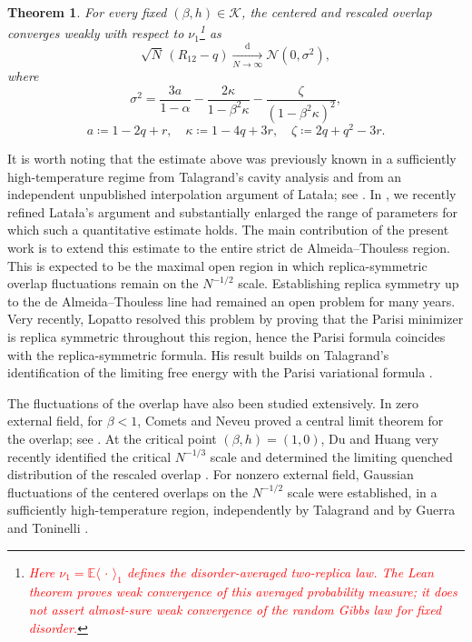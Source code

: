 \documentclass[11pt]{article}
\newtheorem{theorem}{Theorem}[section]
\numberwithin{equation}{section}
\newcommand{\1}{\mathbf 1}
\newcommand{\cK}{\mathcal K}
\begin{document}
\begin{theorem}
\label{thm:overlap-clt-intro}
For every fixed $(\beta,h)\in\cK$, the centered and rescaled overlap
converges weakly with respect to $\nu_1$\footnote{\textcolor{red}{Here $\nu_1=\mathbb E\langle\,\cdot\,\rangle_1$ defines the disorder-averaged two-replica law.  The Lean theorem proves weak convergence of this averaged probability measure; it does not assert almost-sure weak convergence of the random Gibbs law for fixed disorder.}} as
\[
 \sqrt N\,(R_{12}-q)
 \xrightarrow[N\to\infty]{\mathrm d}
 \mathcal N(0,\sigma^2),
\]
where
\[
 \sigma^2
 =
 \frac{3a}{1-\alpha}
 -\frac{2\kappa}{1-\beta^2\kappa}
 -\frac{\zeta}{(1-\beta^2\kappa)^2},\]
\[ a\coloneqq1-2q+r,
 \quad
 \kappa\coloneqq1-4q+3r,
 \quad
 \zeta\coloneqq2q+q^2-3r.
\]
\end{theorem}

It is worth noting that the estimate above was previously known in a sufficiently high-temperature regime from Talagrand's cavity analysis and from an independent unpublished interpolation argument of Lata{\l}a; see \cite{Talagrand,KusuokaNakajima1}. In \cite{KusuokaNakajima1}, we recently refined Lata{\l}a's argument and substantially enlarged the range of parameters for which such a quantitative estimate holds. The main contribution of the present work is to extend this estimate to the entire strict de Almeida--Thouless region. This is expected to be the maximal open region in which replica-symmetric overlap fluctuations remain on the $N^{-1/2}$ scale. Establishing replica symmetry up to the de Almeida--Thouless line had remained an open problem for many years. Very recently, Lopatto \cite{Lopatto} resolved this problem by proving that the Parisi minimizer is replica symmetric throughout this region, hence the Parisi formula coincides with the replica-symmetric formula. His result builds on Talagrand's identification of the limiting free energy with the Parisi variational formula \cite{TalagrandParisi}.

The fluctuations of the overlap have also been studied extensively. In zero external field, for $\beta<1$, Comets and Neveu proved a central limit theorem for the overlap; see \cite{CometsNeveu}. At the critical point $(\beta,h)=(1,0)$, Du and Huang very recently identified the critical $N^{-1/3}$ scale and determined the limiting quenched distribution of the rescaled overlap \cite{DuHuangCriticalOverlap}. For nonzero external field, Gaussian fluctuations of the centered overlaps on the $N^{-1/2}$ scale were established, in a sufficiently high-temperature region, independently by Talagrand and by Guerra and Toninelli \cite{TalagrandRSB,GuerraToninelliCLT}.
\end{document}
